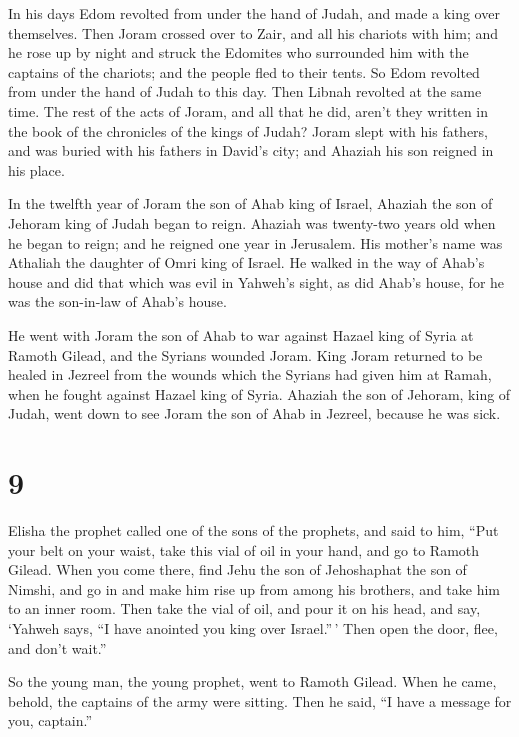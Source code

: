  In his days Edom revolted from under the hand of Judah,
and made a king over themselves.  Then Joram crossed over
to Zair, and all his chariots with him; and he rose up by night and
struck the Edomites who surrounded him with the captains of the
chariots; and the people fled to their tents.  So Edom
revolted from under the hand of Judah to this day. Then Libnah revolted
at the same time.  The rest of the acts of Joram, and all
that he did, aren't they written in the book of the chronicles of the
kings of Judah?  Joram slept with his fathers, and was
buried with his fathers in David's city; and Ahaziah his son reigned in
his place.

 In the twelfth year of Joram the son of Ahab king of
Israel, Ahaziah the son of Jehoram king of Judah began to reign.
 Ahaziah was twenty-two years old when he began to reign;
and he reigned one year in Jerusalem. His mother's name was Athaliah the
daughter of Omri king of Israel.  He walked in the way of
Ahab's house and did that which was evil in Yahweh's sight, as did
Ahab's house, for he was the son-in-law of Ahab's house.

 He went with Joram the son of Ahab to war against Hazael
king of Syria at Ramoth Gilead, and the Syrians wounded Joram.
 King Joram returned to be healed in Jezreel from the
wounds which the Syrians had given him at Ramah, when he fought against
Hazael king of Syria. Ahaziah the son of Jehoram, king of Judah, went
down to see Joram the son of Ahab in Jezreel, because he was sick.

\hypertarget{section-8}{%
\section{9}\label{section-8}}

 Elisha the prophet called one of the sons of the
prophets, and said to him, ``Put your belt on your waist, take this vial
of oil in your hand, and go to Ramoth Gilead.  When you
come there, find Jehu the son of Jehoshaphat the son of Nimshi, and go
in and make him rise up from among his brothers, and take him to an
inner room.  Then take the vial of oil, and pour it on his
head, and say, `Yahweh says, ``I have anointed you king over
Israel.''\,' Then open the door, flee, and don't wait.''

 So the young man, the young prophet, went to Ramoth
Gilead.  When he came, behold, the captains of the army
were sitting. Then he said, ``I have a message for you, captain.''

